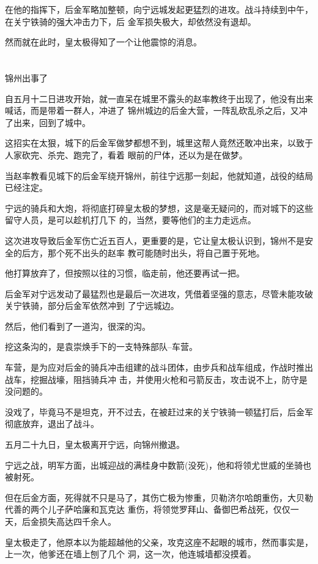 \documentclass[11pt,a4paper,onecolumn]{article}
\begin{document}
在他的指挥下，后金军略加整顿，向宁远城发起更猛烈的进攻。战斗持续到中午，在关宁铁骑的强大冲击力下，后
金军损失极大，却依然没有退却。

然而就在此时，皇太极得知了一个让他震惊的消息。

\section[\thesection]{}

锦州出事了

自五月十二日进攻开始，就一直呆在城里不露头的赵率教终于出现了，他没有出来喊话，而是带着一群人，冲进了
锦州城边的后金大营，一阵乱砍乱杀之后，又冲了出来，回到了城中。

这招实在太狠，城下的后金军做梦都想不到，城里这帮人竟然还敢冲出来，以致于人家砍完、杀完、跑完了，看着
眼前的尸体，还以为是在做梦。

当赵率教看见城下的后金军绕开锦州，前往宁远那一刻起，他就知道，战役的结局已经注定。

宁远的骑兵和大炮，将彻底打碎皇太极的梦想，这是毫无疑问的，而对城下的这些留守人员，是可以趁机打几下
的，当然，要等他们的主力走远点。

这次进攻导致后金军伤亡近五百人，更重要的是，它让皇太极认识到，锦州不是安全的后方，那个死不出头的赵率
教可能随时出头，将自己置于死地。

他打算放弃了，但按照以往的习惯，临走前，他还要再试一把。

后金军对宁远发动了最猛烈也是最后一次进攻，凭借着坚强的意志，尽管未能攻破关宁铁骑，部分后金军依然冲到
了宁远城边。

然后，他们看到了一道沟，很深的沟。

挖这条沟的，是袁崇焕手下的一支特殊部队--车营。

车营，是为应对后金的骑兵冲击组建的战斗团体，由步兵和战车组成，作战时推出战车，挖掘战壕，阻挡骑兵冲
击，并使用火枪和弓箭反击，攻击说不上，防守是没问题的。

没戏了，毕竟马不是坦克，开不过去，在被赶过来的关宁铁骑一顿猛打后，后金军彻底放弃，退出了战斗。

五月二十九日，皇太极离开宁远，向锦州撤退。

宁远之战，明军方面，出城迎战的满桂身中数箭(没死)，他和将领尤世威的坐骑也被射死。

但在后金方面，死得就不只是马了，其伤亡极为惨重，贝勒济尔哈朗重伤，大贝勒代善的两个儿子萨哈廉和瓦克达
重伤，将领觉罗拜山、备御巴希战死，仅仅一天，后金损失高达四千余人。

皇太极走了，他原本以为能超越他的父亲，攻克这座不起眼的城市，然而事实是，上一次，他爹还在墙上刨了几个
洞，这一次，他连城墙都没摸着。
\end{document}
